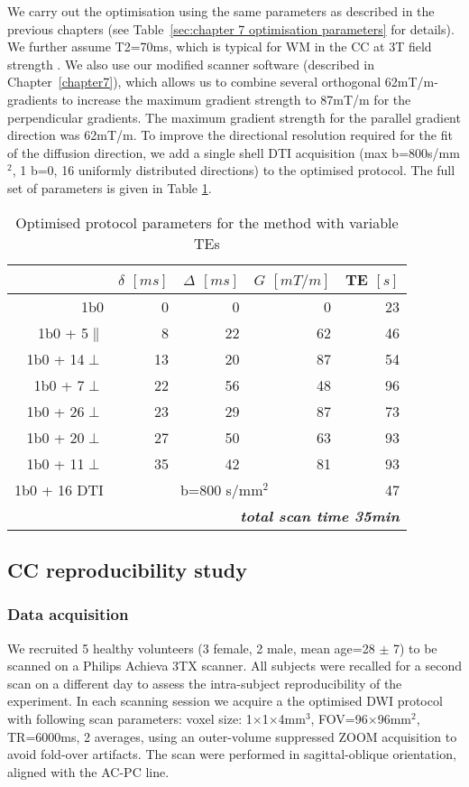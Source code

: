 We carry out the optimisation using the same parameters as described in the previous chapters (see Table~\ref{sec:chapter 7 optimisation parameters} for details). We further assume T2=70ms, which is typical for \gls{WM} in the \gls{CC} at 3T field strength \citep{Stanisz:2005}. We also use our modified scanner software (described in Chapter~\ref{chapter7}), which allows us to combine several orthogonal 62mT/m-gradients to increase the maximum gradient strength to 87mT/m for the perpendicular gradients. The maximum gradient strength for the parallel gradient direction was 62mT/m. To improve the directional resolution required for the fit of the diffusion direction, we add a single shell DTI acquisition (max b=800s/mm$^2$, 1 b=0, 16 uniformly distributed directions) to the optimised protocol. The full set of parameters is given in Table \ref{tab:chap9 protocol table}.

\begin{table}[htbp]
  \centering
  \caption{Optimised protocol parameters for the \SFasym{} method with variable TEs}
    \begin{tabular}{rrrrr}
    \toprule
    	  & $\delta$ $[ms]$   & $\Delta$ $[ms]$ & $G$ $[mT/m]$ & TE $[s]$\\
    \midrule
    {1b0} & {0} & {0} & {0} & {23} \\
    {1b0 + 5$\parallel$} & {8} & {22} & {62} & {46} \\
    {1b0 + 14$\perp$} & {13} & {20} & {87} & {54} \\
    {1b0 + 7$\perp$} & {22} & {56} & {48} & {96} \\
    {1b0 + 26$\perp$} & {23} & {29} & {87} & {73} \\
    {1b0 + 20$\perp$} & {27} & {50} & {63} & {93} \\
    {1b0 + 11$\perp$} & {35} & {42} & {81} & {93} \\
    {1b0 + 16 DTI} & \multicolumn{3}{c}{{b=800 s/mm$^2$}} & {47} \\
    \midrule
    \multicolumn{5}{r}{\textit{\textbf{total scan time 35min}}} \\
    \bottomrule
    \end{tabular}%
  \label{tab:chap9 protocol table}%
\end{table}%

\subsection{CC reproducibility study}
\subsubsection*{Data acquisition}
We recruited 5 healthy volunteers (3 female, 2 male, mean age=28 $\pm$ 7) to be scanned on a Philips Achieva 3TX scanner. All subjects were recalled for a second scan on a different day to assess the intra-subject reproducibility of the experiment. In each scanning session we acquire a the optimised DWI protocol with following scan parameters: voxel size: 1$\times$1$\times$4mm$^3$, FOV=96$\times$96mm$^2$, TR=6000ms, 2 averages, using an outer-volume suppressed ZOOM acquisition \citep{Wilm:2007} to avoid fold-over artifacts. The scan were performed in sagittal-oblique orientation, aligned with the AC-PC line.
